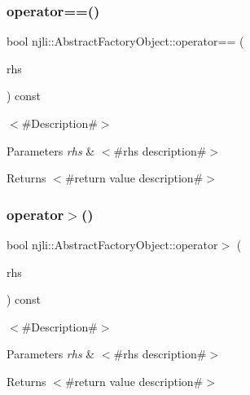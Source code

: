 \subsubsection{\texorpdfstring{operator==()}{operator==()}}
{\footnotesize\ttfamily bool njli\+::\+Abstract\+Factory\+Object\+::operator== (\begin{DoxyParamCaption}\item[{const \mbox{\hyperlink{classnjli_1_1_abstract_factory_object}{Abstract\+Factory\+Object}} \&}]{rhs }\end{DoxyParamCaption}) const}

$<$\#\+Description\#$>$


\begin{DoxyParams}{Parameters}
{\em rhs} & $<$\#rhs description\#$>$\\
\hline
\end{DoxyParams}
\begin{DoxyReturn}{Returns}
$<$\#return value description\#$>$ 
\end{DoxyReturn}
\mbox{\label{classnjli_1_1_abstract_factory_object_aebb630b30d4649b79a5655471cf727a9}} 
\subsubsection{\texorpdfstring{operator$>$()}{operator>()}}
{\footnotesize\ttfamily bool njli\+::\+Abstract\+Factory\+Object\+::operator$>$ (\begin{DoxyParamCaption}\item[{const \mbox{\hyperlink{classnjli_1_1_abstract_factory_object}{Abstract\+Factory\+Object}} \&}]{rhs }\end{DoxyParamCaption}) const}

$<$\#\+Description\#$>$


\begin{DoxyParams}{Parameters}
{\em rhs} & $<$\#rhs description\#$>$\\
\hline
\end{DoxyParams}
\begin{DoxyReturn}{Returns}
$<$\#return value description\#$>$ 
\end{DoxyReturn}
\mbox{\label{classnjli_1_1_abstract_factory_object_a8ce0719b53e2cca86046b6dbd31aa6af}} 
